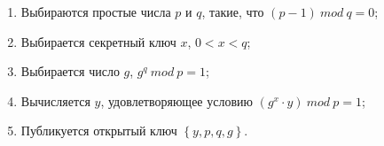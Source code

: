 \begin{enumerate}
\item Выбираются простые числа $p$ и $q$, такие, что $(p - 1) \ mod \ q = 0$;
\item Выбирается секретный ключ $x$, $0 < x < q$;
\item Выбирается число $g$, $g^q \ mod \ p = 1$;
\item Вычисляется $y$, удовлетворяющее условию $(g^x \cdot y) \ mod \ p = 1$;
\item Публикуется открытый ключ $\left\{y, p, q, g\right\}$.
\end{enumerate}